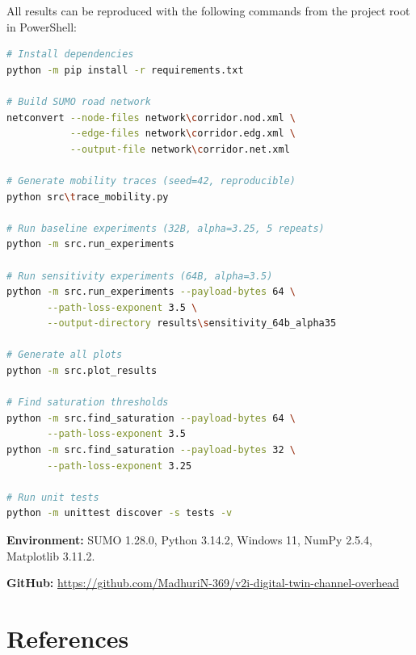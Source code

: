 \documentclass[12pt, a4paper]{article}
\begin{document}
All results can be reproduced with the following commands from the project
root in PowerShell:

\begin{lstlisting}[language=bash]
# Install dependencies
python -m pip install -r requirements.txt

# Build SUMO road network
netconvert --node-files network\corridor.nod.xml \
           --edge-files network\corridor.edg.xml \
           --output-file network\corridor.net.xml

# Generate mobility traces (seed=42, reproducible)
python src\trace_mobility.py

# Run baseline experiments (32B, alpha=3.25, 5 repeats)
python -m src.run_experiments

# Run sensitivity experiments (64B, alpha=3.5)
python -m src.run_experiments --payload-bytes 64 \
       --path-loss-exponent 3.5 \
       --output-directory results\sensitivity_64b_alpha35

# Generate all plots
python -m src.plot_results

# Find saturation thresholds
python -m src.find_saturation --payload-bytes 64 \
       --path-loss-exponent 3.5
python -m src.find_saturation --payload-bytes 32 \
       --path-loss-exponent 3.25

# Run unit tests
python -m unittest discover -s tests -v
\end{lstlisting}

\textbf{Environment:} SUMO 1.28.0, Python 3.14.2, Windows 11, NumPy 2.5.4,
Matplotlib 3.11.2.

\textbf{GitHub:}
\url{https://github.com/MadhuriN-369/v2i-digital-twin-channel-overhead}

\section*{References}
\end{document}
